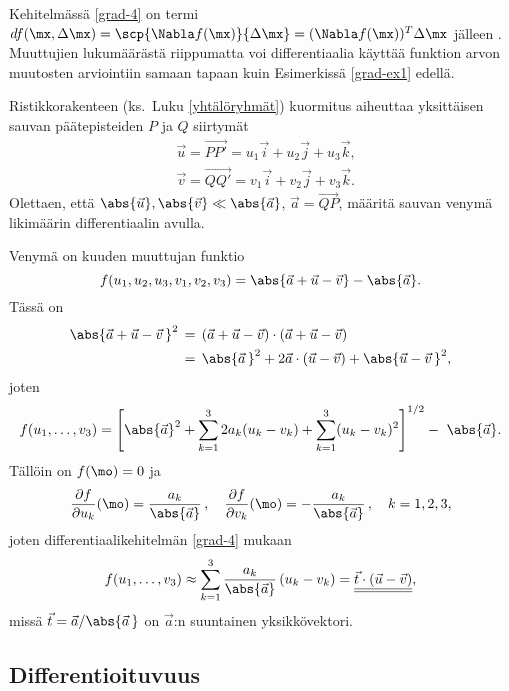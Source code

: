 Kehitelmässä \eqref{grad-4} on termi
$df(\mx,\Delta\mx) = \scp{\Nabla f(\mx)}{\Delta\mx} = (\Nabla f(\mx))^T\Delta\mx$ 
%
jälleen . Muuttujien lukumäärästä riippumatta voi differentiaalia käyttää 
funktion arvon muutosten arviointiin samaan tapaan kuin Esimerkissä \ref{grad-ex1} edellä.
\begin{Exa} Ristikkorakenteen (ks.\ Luku \ref{yhtälöryhmät}) kuormitus aiheuttaa yksittäisen 
sauvan päätepisteiden $P$ ja $Q$ siirtymät
\begin{align*}
&\vec u = \overrightarrow{PP'}=u_1\vec i+u_2\vec j+u_3\vec k, \\
&\vec v = \overrightarrow{QQ'}=v_1\vec i + v_2\vec j+v_3\vec k.
\end{align*}
Olettaen, että $\abs{\vec u},\abs{\vec v}\ll\abs{\vec a}$, $\vec a=\overrightarrow{QP}$,
määritä sauvan venymä likimäärin differentiaalin avulla.
\end{Exa}
\ratk Venymä on kuuden muuttujan funktio
\[
f(u_1,u_2,u_3,v_1,v_2,v_3) = \abs{\vec a+\vec u-\vec v}-\abs{\vec a}.
\]
Tässä on
\begin{align*}
\abs{\vec a+\vec u-\vec v\,}^2\,
             &=\,(\vec a+\vec u-\vec v)\cdot (\vec a+\vec u-\vec v) \\
             &=\,\abs{\vec a\,}^2+2\vec a\cdot(\vec u-\vec v)+\abs{\vec u-\vec v\,}^2,
\end{align*}
joten
\[
f(u_1,\ldots,v_3) 
 =\left[\abs{\vec a}^2+\sum_{k=1}^3 2a_k(u_k-v_k)+\sum_{k=1}^3 (u_k-v_k)^2\right]^{1/2}
                                                 -\ \abs{\vec a}.
\]
Tällöin on $f(\mo)=0$ ja
\[
\frac{\partial f}{\partial u_k}(\mo)
              =\frac{a_k}{\abs{\vec a}}\,,\quad \frac{\partial f}{\partial v_k}(\mo)
              =-\frac{a_k}{\abs{\vec a}}\,, \quad k=1,2,3,
\]
joten differentiaalikehitelmän \eqref{grad-4} mukaan
\[ 
f(u_1,\ldots,v_3) \approx \sum_{k=1}^3 \frac{a_k}{\abs{\vec a}}\,(u_k-v_k) 
                        = \underline{\underline{\vec t\cdot (\vec u-\vec v)}},
\]
missä $\vec t=\vec a/\abs{\vec a\,}$ on $\vec a$:n suuntainen yksikkövektori. \loppu

\subsection*{Differentioituvuus}

